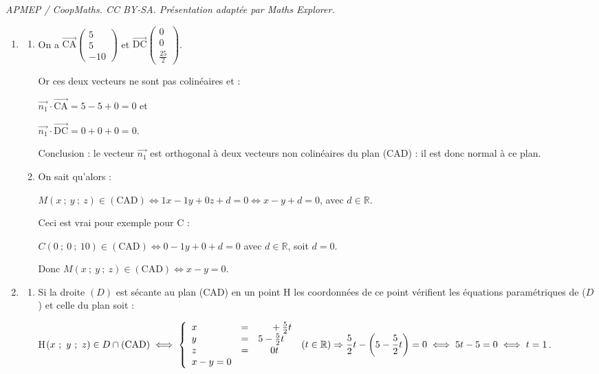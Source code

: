 \documentclass[10pt]{article}
\providecommand{\R}{\mathbb{R}}
\providecommand{\vect}[1]{\overrightarrow{#1}}
\begin{document}
\noindent\textit{APMEP / CoopMaths. CC BY-SA. Présentation adaptée par Maths Explorer.}\par\medskip
\medskip

\begin{enumerate}
\item
	\begin{enumerate}
		\item On a $\vect{\text{CA}}\begin{pmatrix}5\\5\\-10\end{pmatrix}$ et $\vect{\text{DC}}\begin{pmatrix}0\\0\\\frac{25}{2}\end{pmatrix}$.
		
Or ces deux vecteurs ne sont pas colinéaires et :

$\vect{n_1} \cdot \vect{\text{CA}} = 5 - 5 + 0 = 0$ et 

$\vect{n_1} \cdot \vect{\text{DC}} = 0 +  0 + 0 = 0$.

Conclusion : le vecteur $\vect{n_1}$ est orthogonal à deux vecteurs non colinéaires du plan (CAD) : il est donc normal à ce plan.
		\item On sait qu'alors :
		
$M(x~;~y~;~z) \in (\text{CAD}) \iff 1x - 1y + 0z + d = 0 \iff x - y + d = 0$, avec \:$ d \in \R$.

Ceci est vrai pour exemple pour C :

$C(0~;~0~;~10) \in (\text{CAD}) \iff 0 - 1y + 0 + d = 0$  avec \: $d \in \R$, soit $d = 0$.

Donc $M(x~;~y~;~z) \in (\text{CAD}) \iff x - y  = 0$.
	\end{enumerate}
\item
	\begin{enumerate}
		\item Si la droite $(D)$ est sécante au plan (CAD) en un point H les coordonnées de ce point vérifient les équations paramétriques de ($D$) et celle du plan soit :

H$(x~;~y~;~z) \in D \cap (\text{CAD})\iff \left\{\begin{array}{l c l}
x&=&\phantom{5 -} + \frac52 t\\
y &=&5 - \frac52 t\\
z&=&\phantom{5 -}0t\\
x - y = 0
\end{array}\right.\:(t \in \R) \Rightarrow \dfrac52t - \left(5 - \dfrac52 t \right) = 0 \iff 5t - 5 = 0 \iff t = 1$.


\end{enumerate}
\end{enumerate}
\end{document}

